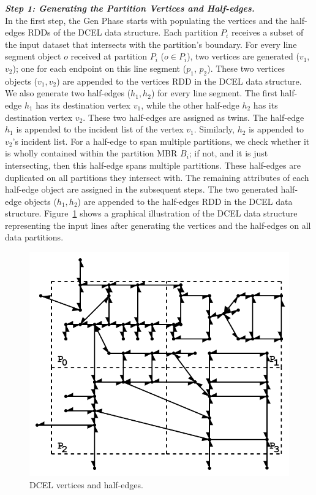 \vspace{4pt}
\textit{\textbf{Step 1: Generating the Partition Vertices and Half-edges.}}
\\
In the first step, the Gen Phase starts with populating the vertices and the half-edges RDDs of the DCEL data structure.
Each partition $P_i$ receives a subset of the input dataset that intersects with the partition's boundary.
For every line segment object $o$ received at partition $P_i$ ($o \in P_i$), two vertices are generated ($v_1$, $v_2$); one for each endpoint on this line segment ($p_1$, $p_2$). These two vertices objects ($v_1, v_2$) are appended to the vertices RDD in the DCEL data structure.
We also generate two half-edges ($h_1, h_2$) for every line segment. 
The first half-edge $h_1$ has its destination vertex $v_1$, while the other half-edge $h_2$ has its destination vertex $v_2$. These two half-edges are assigned as twins.
The half-edge $h_1$ is appended to the incident list of the vertex $v_1$. Similarly, $h_2$ is appended to $v_2$'s incident list.
For a half-edge to span multiple partitions, we check whether it is wholly contained within the partition MBR $B_i$; if not, and it is just intersecting, then this half-edge spans multiple partitions. 
These half-edges are duplicated on all partitions they intersect with.
The remaining attributes of each half-edge object are assigned in the subsequent steps. 
The two generated half-edge objects ($h_1, h_2$) are appended to the half-edges RDD in the DCEL data structure.
Figure~\ref{fig:ddcel:step1} shows a graphical illustration of the DCEL data structure representing the input lines after generating the vertices and the half-edges on all data partitions.


\begin{figure}[tb]
	\centering
	\includegraphics[width=0.75 \linewidth ]{chapter2/model/ddcel-1.png}
	\caption{DCEL vertices and half-edges.}
	\label{fig:ddcel:step1}
\end{figure}


